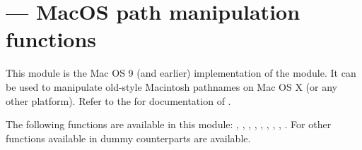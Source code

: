 
\section{ ---
         MacOS path manipulation functions}



This module is the Mac OS 9 (and earlier) implementation of the 
module. It can be used to manipulate old-style Macintosh pathnames on Mac OS
X (or any other platform).
Refer to the
 for
documentation of .

The following functions are available in this module:
,
,
,
,
,
,
,
,
.
For other functions available in  dummy counterparts
are available.

